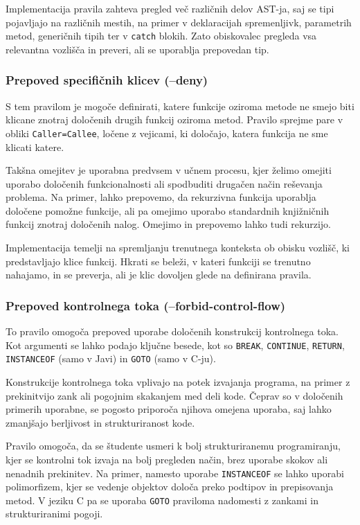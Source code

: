 \documentclass[a4paper,12pt,openright]{book}
\begin{document}
Implementacija pravila zahteva pregled več različnih delov AST-ja, saj se tipi pojavljajo na različnih mestih, na primer v deklaracijah spremenljivk, parametrih metod, generičnih tipih ter v \texttt{catch} blokih. Zato obiskovalec pregleda vsa relevantna vozlišča in preveri, ali se uporablja prepovedan tip.

\subsubsection{Prepoved specifičnih klicev (--deny)}

S tem pravilom je mogoče definirati, katere funkcije oziroma metode ne smejo biti klicane znotraj določenih drugih funkcij oziroma metod. Pravilo sprejme pare v obliki \texttt{Caller=Callee}, ločene z vejicami, ki določajo, katera funkcija ne sme klicati katere.

Takšna omejitev je uporabna predvsem v učnem procesu, kjer želimo omejiti uporabo določenih funkcionalnosti ali spodbuditi drugačen način reševanja problema. Na primer, lahko prepovemo, da rekurzivna funkcija uporablja določene pomožne funkcije, ali pa omejimo uporabo standardnih knjižničnih funkcij znotraj določenih nalog. Omejimo in prepovemo lahko tudi rekurzijo.

Implementacija temelji na spremljanju trenutnega konteksta ob obisku vozlišč, ki predstavljajo klice funkcij. Hkrati se beleži, v kateri funkciji se trenutno nahajamo, in se preverja, ali je klic dovoljen glede na definirana pravila.

\subsubsection{Prepoved kontrolnega toka (--forbid-control-flow)}

To pravilo omogoča prepoved uporabe določenih konstrukcij kontrolnega toka. Kot argumenti se lahko podajo ključne besede, kot so \texttt{BREAK}, \texttt{CONTINUE}, \texttt{RETURN}, \texttt{INSTANCEOF} (samo v Javi) in \texttt{GOTO} (samo v C-ju).

Konstrukcije kontrolnega toka vplivajo na potek izvajanja programa, na primer z prekinitvijo zank ali pogojnim skakanjem med deli kode. Čeprav so v določenih primerih uporabne, se pogosto priporoča njihova omejena uporaba, saj lahko zmanjšajo berljivost in strukturiranost kode.

Pravilo omogoča, da se študente usmeri k bolj strukturiranemu programiranju, kjer se kontrolni tok izvaja na bolj pregleden način, brez uporabe skokov ali nenadnih prekinitev. Na primer, namesto uporabe \texttt{INSTANCEOF} se lahko uporabi polimorfizem, kjer se vedenje objektov določa preko podtipov in prepisovanja metod. V jeziku C pa se uporaba \texttt{GOTO} praviloma nadomesti z zankami in strukturiranimi pogoji.
\end{document}
